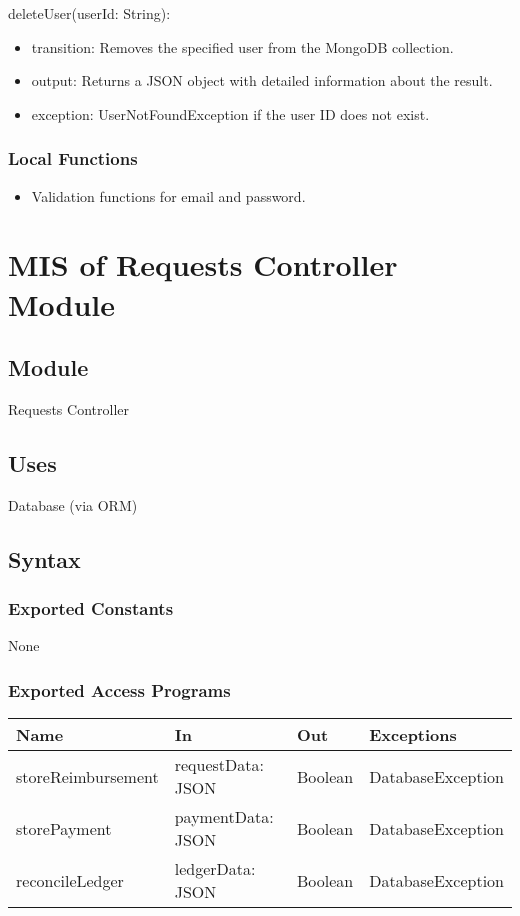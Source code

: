 \documentclass[12pt, titlepage]{article}
\begin{document}
\noindent deleteUser(userId: String):
\begin{itemize}
  \item transition: Removes the specified user from the MongoDB collection.
  \item output: Returns a JSON object with detailed information about the result.
  \item exception: UserNotFoundException if the user ID does not exist.
\end{itemize}

\subsubsection{Local Functions}
\begin{itemize}
  \item Validation functions for email and password.
\end{itemize}

\section{MIS of Requests Controller Module} \label{RequestsController}

\subsection{Module}
Requests Controller

\subsection{Uses}
Database (via ORM)

\subsection{Syntax}

\subsubsection{Exported Constants}
None

\subsubsection{Exported Access Programs}
\begin{center}
\begin{tabular}{p{2cm} p{4cm} p{4cm} p{2cm}}
\hline
\textbf{Name} & \textbf{In} & \textbf{Out} & \textbf{Exceptions} \\
\hline
storeReimbursement & requestData: JSON & Boolean & DatabaseException \\
storePayment & paymentData: JSON & Boolean & DatabaseException \\
reconcileLedger & ledgerData: JSON & Boolean & DatabaseException \\
\hline
\end{tabular}
\end{center}
\end{document}
